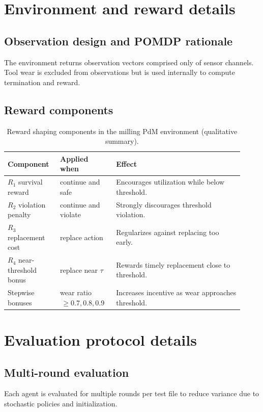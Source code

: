 \documentclass[sn-basic]{sn-jnl} %
\begin{document}
\begin{appendices}

\section{Environment and reward details}
\label{app:env_reward}
\subsection{Observation design and POMDP rationale}
The environment returns observation vectors comprised only of sensor channels. Tool wear is excluded from observations but is used internally to compute termination and reward.

\subsection{Reward components}
\begin{table}[t]
        \centering
        \caption{Reward shaping components in the milling PdM environment (qualitative summary).}
        \label{tab:reward_components}
        \begin{tabular}{p{0.20\linewidth} p{0.22\linewidth} p{0.50\linewidth}}
                \toprule
                \textbf{Component} & \textbf{Applied when} & \textbf{Effect}\\
                \midrule
                $R_1$ survival reward & continue and safe & Encourages utilization while below threshold.\\
                $R_2$ violation penalty & continue and violate & Strongly discourages threshold violation.\\
                $R_3$ replacement cost & replace action & Regularizes against replacing too early.\\
                $R_4$ near-threshold bonus & replace near $\tau$ & Rewards timely replacement close to threshold.\\
                Stepwise bonuses & wear ratio $\,\ge 0.7, 0.8, 0.9$ & Increases incentive as wear approaches threshold.\\
                \bottomrule
        \end{tabular}
\end{table}

\section{Evaluation protocol details}
\label{app:eval}
\subsection{Multi-round evaluation}
Each agent is evaluated for multiple rounds per test file to reduce variance due to stochastic policies and initialization.


\end{appendices}
\end{document}
